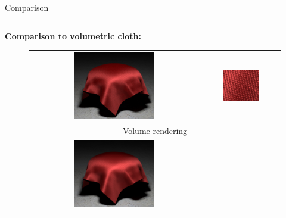 \documentclass[final]{beamer}
\newlength{\onecolwid}
\newlength{\twocolwid}
\begin{document}
\begin{frame}[t]
\begin{columns}[t]
\begin{column}{\twocolwid}
\begin{block}{Comparison}
\begin{columns}[t,totalwidth=\twocolwid]
                \begin{column}{\onecolwid}
                    \textbf{Comparison to volumetric cloth:}
                    \begin{figure}
                        \vspace{-1cm}
                    	\begin{tabular}{cc}
                    		\includegraphics[width=0.49\textwidth]{images/results/gabardine_ref.jpg} &
                    		\includegraphics[width=0.49\textwidth]{images/results/gabardine_ref_inset_128spp.jpg} \\
                    		\multicolumn{2}{c}{\vspace{1cm} \small{Volume rendering}} \\
                    		\includegraphics[width=0.49\textwidth]{images/results/gabardine.jpg} &

\end{tabular}
\end{figure}
\end{column}
\end{columns}
\end{block}
\end{column}
\end{columns}
\end{frame}
\end{document}
